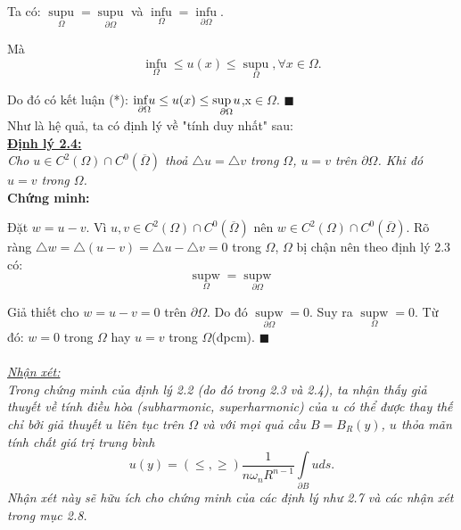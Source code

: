 Ta có: 
 $\mathop {\sup u}\limits_\Omega   = \mathop {\sup u}\limits_{\partial \Omega }$ và
  $\mathop {\inf u}\limits_\Omega  = \mathop {\inf u}\limits_{\partial \Omega } $.
  
Mà  \[ \mathop {\inf u}\limits_\Omega \leq u(x) \leq \mathop {\sup u}\limits_\Omega, \forall x\in\Omega.\]

Do đó có kết luận (*):
$\mathop{{\rm{inf}}u}\limits_{\partial\Omega } \leq u(x) \leq\mathop {\sup u}\limits_{\partial \Omega }$,x$\in\Omega$. $\blacksquare$
\\

Như là hệ quả, ta có định lý về "tính duy nhất" sau:
\\
\textbf{\underline{Định lý 2.4:}}
\\
\textit{Cho $u \in C^2 (\Omega) \cap C^0 (\overline\Omega)$  thoả $\bigtriangleup u = \bigtriangleup v$ trong $\Omega$, $u = v$ trên $\partial\Omega$. Khi đó $u = v$ trong $\Omega$.}
\\
\textbf{Chứng minh:}

Đặt $w = u - v$. Vì $u,v \in C^2( \Omega) \cap C^0(\overline\Omega)$ nên $w \in C^2( \Omega) \cap C^0 (\overline\Omega)$. Rõ ràng $\triangle w = \triangle (u-v) = \triangle u -\triangle v =0$ trong $\Omega$, $\Omega$ bị chận nên theo định lý 2.3 có: 
\[\mathop {\sup w}\limits_\Omega   = \mathop {\sup w}\limits_{\partial \Omega }\]

Giả thiết cho $w =u-v =0$ trên $\partial\Omega$. Do đó 
$\mathop {\sup w}\limits_{\partial \Omega }=0$.
Suy ra $\mathop {\sup w}\limits_\Omega   = 0$.
Từ đó: $w=0$ trong $\Omega$ hay $u= v$ trong $\Omega$(đpcm). $\blacksquare$
\\
\\
\textit{\underline{Nhận xét:}
\\
Trong chứng minh của định lý 2.2 (do đó trong 2.3 và 2.4), ta nhận thấy giả thuyết về tính điều hòa (subharmonic, superharmonic) của $u$ có thể được thay thế chỉ bởi giả thuyết $u$ liên tục trên $\Omega$ và với mọi quả cầu $B = B_R{(y)}$, $u$ thỏa mãn tính chất giá trị trung bình
\[ u(y)=(\leq , \geq ) \frac{1}{n\omega_n R^{n-1}}\int\limits_{\partial B} {uds}.\]
Nhận xét này sẽ hữu ích cho chứng minh của các định lý như 2.7 và các nhận xét trong mục 2.8.}
